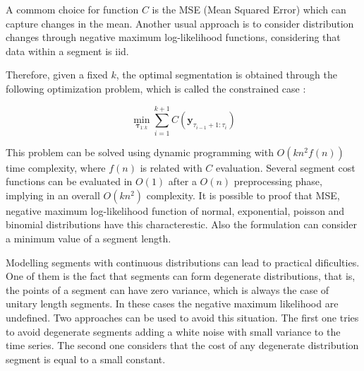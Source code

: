 A commom choice for function $C$ is the MSE (Mean Squared Error) which can capture changes in the mean. Another usual approach is to consider distribution changes through negative maximum log-likelihood functions, considering that data within a segment is iid. 

Therefore, given a fixed $k$, the optimal segmentation is obtained through the following optimization problem, which is called the constrained case \cite{optimal_detection_of_changepoints_with_a_linear_computational_cost}: 

\begin{equation}
    \min_{\boldsymbol \tau_{1 : k}} \sum \limits_{i = 1}^{k + 1} C(\mathbf{y}_{\tau_{i - 1} + 1 : \tau_{i}})
\end{equation}

This problem can be solved using dynamic programming with $O(k n^2 f(n))$ time complexity, where $f(n)$ is related with $C$ evaluation. Several segment cost functions can be evaluated in $O(1)$ after a $O(n)$ preprocessing phase, implying in an overall $O(k n^2)$ complexity. It is possible to proof that MSE, negative maximum log-likelihood function of normal, exponential, poisson and binomial distributions have this characterestic. Also the formulation can consider a minimum value of a segment length.

Modelling segments with continuous distributions can lead to practical dificulties. One of them is the fact that segments can form degenerate distributions, that is, the points of a segment can have zero variance, which is always the case of unitary length segments. In these cases the negative maximum likelihood are undefined. Two approaches can be used to avoid this situation. The first one tries to avoid degenerate segments adding a white noise with small variance to the time series. The second one considers that the cost of any degenerate distribution segment is equal to a small constant.



